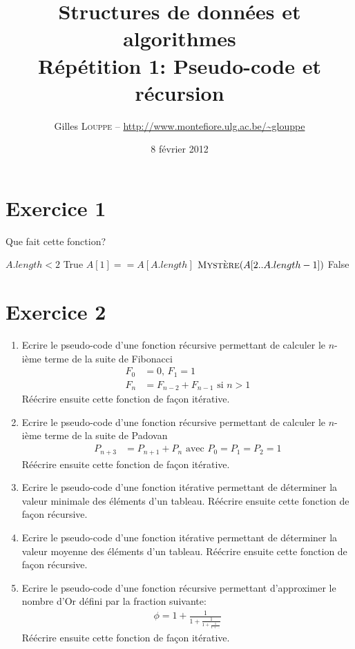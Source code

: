 \documentclass[a4paper,10pt]{article}
\title{
    \textbf{Structures de données et algorithmes}\\
    Répétition 1: Pseudo-code et récursion
}
\author{Gilles \textsc{Louppe} -- \url{http://www.montefiore.ulg.ac.be/~glouppe}}
\date{8 février 2012}
\begin{document}
\maketitle

\section*{Exercice 1}

Que fait cette fonction?

\begin{codebox}
    \li \If $A.length < 2$
    \li \Then   \Return True
    \li \Else
    \li       \If $A[1] == A[A.length]$
    \li       \Then \Return $\textnormal{\scshape Mystère}(A[2..A.length-1])$
    \li       \Else
    \li             \Return False
              \End
        \End
    \End
\end{codebox}
\vspace{0.5cm}

\section*{Exercice 2}

\begin{enumerate}
\item Ecrire le pseudo-code d'une fonction récursive permettant de calculer le $n$-ième terme de la suite de Fibonacci
\begin{align*}
F_0 &= 0\text{, } F_1 = 1 \\
F_n &= F_{n-2} + F_{n-1} \text{ si } n > 1
\end{align*}
Réécrire ensuite cette fonction de façon itérative.

\item Ecrire le pseudo-code d'une fonction récursive permettant de calculer le $n$-ième terme de la suite de Padovan
\begin{align*}
P_{n+3} &= P_{n+1} + P_n \text{ avec } P_0 = P_1 = P_2 = 1
\end{align*}
Réécrire ensuite cette fonction de façon itérative.

\item Ecrire le pseudo-code d'une fonction itérative permettant de déterminer la valeur minimale des éléments d'un tableau. Réécrire ensuite cette fonction de façon récursive.

\item Ecrire le pseudo-code d'une fonction itérative permettant de déterminer la valeur moyenne des éléments d'un tableau. Réécrire ensuite cette fonction de façon récursive.

\item Ecrire le pseudo-code d'une fonction récursive permettant d'approximer le nombre d'Or défini par la fraction suivante:
\begin{align*}
\phi = 1 + \frac{1}{1 + \frac{1}{1 + \frac{1}{1 + ...}}}
\end{align*}
Réécrire ensuite cette fonction de façon itérative.

\end{enumerate}
\end{document}
